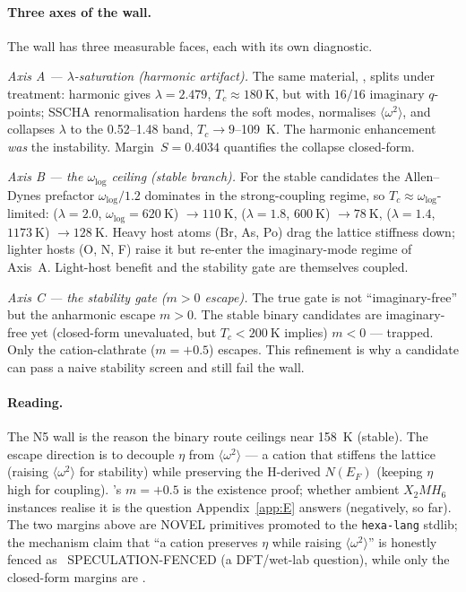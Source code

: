 \paragraph{Three axes of the wall.}
The wall has three measurable faces, each with its own diagnostic.

\emph{Axis A --- $\lambda$-saturation (harmonic artifact).} The same
material, , splits under treatment: harmonic gives $\lambda=2.479$,
$T_c\approx\SI{180}{\kelvin}$, but with $16/16$ imaginary $q$-points;
SSCHA renormalisation hardens the soft modes, normalises
$\langle\omega^2\rangle$, and collapses $\lambda$ to the 0.52--1.48 band,
$T_c\to9$--\SI{109}{\kelvin}. The harmonic enhancement \emph{was} the
instability. Margin~$S=0.4034$ quantifies the collapse closed-form.

\emph{Axis B --- the $\omega_{\log}$ ceiling (stable branch).} For the stable
candidates the Allen--Dynes prefactor $\omega_{\log}/1.2$ dominates in the
strong-coupling regime, so $T_c\approx\omega_{\log}$-limited:
 ($\lambda=2.0$, $\omega_{\log}=\SI{620}{\kelvin}$)
$\to\SI{110}{\kelvin}$,  ($\lambda=1.8$, $\SI{600}{\kelvin}$)
$\to\SI{78}{\kelvin}$,  ($\lambda=1.4$, $\SI{1173}{\kelvin}$)
$\to\SI{128}{\kelvin}$. Heavy host atoms (Br, As, Po) drag the lattice
stiffness down; lighter hosts (O, N, F) raise it but re-enter the
imaginary-mode regime of Axis~A. Light-host benefit and the stability gate
are themselves coupled.

\emph{Axis C --- the stability gate ($m>0$ escape).} The true gate is not
``imaginary-free'' but the anharmonic escape $m>0$. The stable binary
candidates are imaginary-free yet (closed-form unevaluated, but
$T_c<\SI{200}{\kelvin}$ implies) $m<0$ --- trapped. Only the cation-clathrate
 ($m=+0.5$) escapes. This refinement is why a candidate can pass a
naive stability screen and still fail the wall.

\paragraph{Reading.}
The N5 wall is the reason the binary route ceilings near \SI{158}{\kelvin}
(stable). The escape direction is to decouple $\eta$ from
$\langle\omega^2\rangle$ --- a cation that stiffens the lattice (raising
$\langle\omega^2\rangle$ for stability) while preserving the H-derived
$N(E_F)$ (keeping $\eta$ high for coupling). 's $m = +0.5$ is the
existence proof; whether ambient $X_2MH_6$ instances realise it is the
question Appendix~\ref{app:E} answers (negatively, so far). The two margins
above are NOVEL primitives promoted to the \texttt{hexa-lang} stdlib; the
mechanism claim that ``a cation preserves $\eta$ while raising
$\langle\omega^2\rangle$'' is honestly fenced as \tierWhite\
SPECULATION-FENCED (a DFT/wet-lab question), while only the closed-form
margins are \tierGreen.
